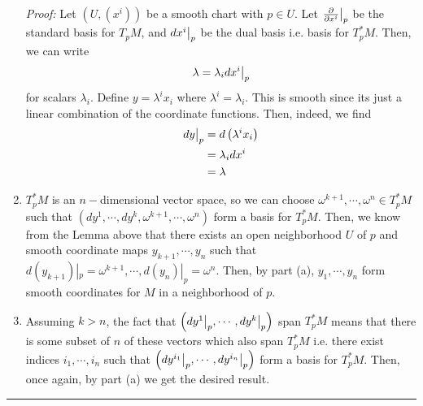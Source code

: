 \documentclass{article}
\newcommand{\restr}[2]{{%
  \left.\kern-\nulldelimiterspace %
  #1 %
  \vphantom{\big|} %
  \right|_{#2} %
  }}
\begin{document}
\begin{enumerate}[label=(\alph*)]
\begin{dottedbox}
    \vskip 0.5cm
    \emph{Proof:} Let $\left(U, (x^i)\right)$ be a smooth chart with $p \in U$. Let $\restr{\frac{\partial}{\partial x^i}}{p}$ be the standard basis for $T_p M$, and $\restr{dx^i}{p}$ be the dual basis i.e. basis for $T_p^* M$. Then, we can write 
    \[ \lambda = \lambda_i \restr{dx^i}{p} \] for scalars $\lambda_i$. Define $y = \lambda^i x_i$ where $\lambda^i = \lambda_i$. This is smooth since its just a linear combination of the coordinate functions. Then, indeed, we find 
    \begin{align*}
      \restr{dy}{p} &= d \left( \lambda^i x_i \right) \\
      &= \lambda_i dx^i \\
      &= \lambda
    \end{align*}
  \end{dottedbox}


  \vskip 0.5cm
  \item $T_p^* M$ is an $n-$dimensional vector space, so we can choose $\omega^{k+1}, \cdots, \omega^n \in T_p^*M$ such that $\left(dy^1, \cdots, dy^k, \omega^{k+1}, \cdots, \omega^{n}\right)$ form a basis for $T_p^*M$. Then, we know from the Lemma above that there exists an open neighborhood $U$ of $p$ and smooth coordinate maps $y_{k+1}, \cdots, y_n$ such that $d\left(y_{k+1}\right)|_{p} = \omega^{k+1}, \cdots, d\left(y_{n}\right)|_{p} = \omega^{n}$. Then, by part (a), $y_1, \cdots, y_n$ form smooth coordinates for $M$ in a neighborhood of $p$.
  
  \vskip 0.5cm
  \item Assuming $k > n$, the fact that $\left(\restr{dy^1}{p}, \cdots, \restr{dy^k}{p}\right)$ span $T_p^* M$ means that there is some subset of $n$ of these vectors which also span $T_p^*M$ i.e. there exist indices $i_1, \cdots, i_n$ such that $\left(\restr{dy^{i_1}}{p}, \cdots, \restr{dy^{i_n}}{p}\right)$ form a basis for $T_p^* M$. Then, once again, by part (a) we get the desired result.
\end{enumerate}


\vskip 0.5cm
\hrule 
\vskip 0.5cm
\end{document}

